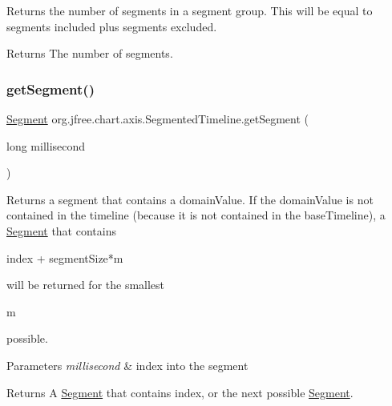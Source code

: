 Returns the number of segments in a segment group. This will be equal to segments included plus segments excluded.

\begin{DoxyReturn}{Returns}
The number of segments. 
\end{DoxyReturn}
\mbox{\label{classorg_1_1jfree_1_1chart_1_1axis_1_1_segmented_timeline_a4035b2f6b357508c3c30cc7ff83fd46e}} 
\subsubsection{\texorpdfstring{get\+Segment()}{getSegment()}\hspace{0.1cm}{\footnotesize\ttfamily [1/2]}}
{\footnotesize\ttfamily \mbox{\hyperlink{classorg_1_1jfree_1_1chart_1_1axis_1_1_segmented_timeline_1_1_segment}{Segment}} org.\+jfree.\+chart.\+axis.\+Segmented\+Timeline.\+get\+Segment (\begin{DoxyParamCaption}\item[{long}]{millisecond }\end{DoxyParamCaption})}

Returns a segment that contains a domain\+Value. If the domain\+Value is not contained in the timeline (because it is not contained in the base\+Timeline), a \mbox{\hyperlink{classorg_1_1jfree_1_1chart_1_1axis_1_1_segmented_timeline_1_1_segment}{Segment}} that contains 
\begin{DoxyCode}
index + segmentSize*m 
\end{DoxyCode}
 will be returned for the smallest 
\begin{DoxyCode}
m 
\end{DoxyCode}
 possible.


\begin{DoxyParams}{Parameters}
{\em millisecond} & index into the segment\\
\hline
\end{DoxyParams}
\begin{DoxyReturn}{Returns}
A \mbox{\hyperlink{classorg_1_1jfree_1_1chart_1_1axis_1_1_segmented_timeline_1_1_segment}{Segment}} that contains index, or the next possible \mbox{\hyperlink{classorg_1_1jfree_1_1chart_1_1axis_1_1_segmented_timeline_1_1_segment}{Segment}}. 
\end{DoxyReturn}
\mbox{\label{classorg_1_1jfree_1_1chart_1_1axis_1_1_segmented_timeline_afc06aca3eebe56d0ffbb6b4dbf3b555b}} 
